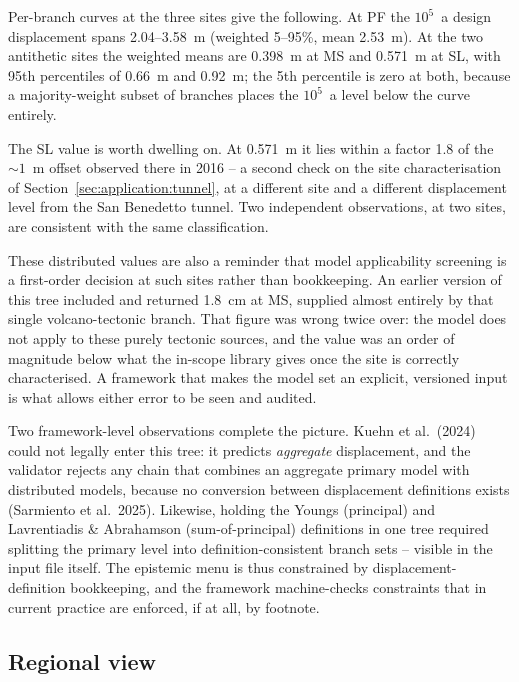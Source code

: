 Per-branch curves at the three sites give the following. At PF the
$10^{5}$~a design displacement spans 2.04--3.58~m (weighted 5--95\%,
mean 2.53~m). At the two antithetic sites the weighted means
are 0.398~m at MS and 0.571~m at SL, with 95th percentiles of 0.66~m
and 0.92~m; the 5th percentile is zero at both, because a
majority-weight subset of branches places the $10^{5}$~a level below
the curve entirely.

The SL value is worth dwelling on. At 0.571~m it lies within a factor
1.8 of the ${\sim}1$~m offset observed there in 2016 -- a second check
on the site characterisation of
Section~\ref{sec:application:tunnel}, at a different site and a
different displacement level from the San Benedetto tunnel. Two
independent observations, at two sites, are consistent with the same
classification.

These distributed values are also a reminder that model applicability
screening is a first-order decision at such sites rather than
bookkeeping. An earlier version of this tree included
\citet{FerrarioLivio2021} and returned 1.8~cm at MS, supplied almost
entirely by that single volcano-tectonic branch. That figure was wrong
twice over: the model does not apply to these purely tectonic sources,
and the value was an order of magnitude below what the in-scope
library gives once the site is correctly characterised. A framework
that makes the model set an explicit, versioned input is what allows
either error to be seen and audited.

Two framework-level observations complete the picture. Kuehn et
al.\ (2024) could not legally enter this tree: it predicts
\emph{aggregate} displacement, and the validator rejects any chain that
combines an aggregate primary model with distributed models, because no
conversion between displacement definitions exists (Sarmiento et
al.\ 2025). Likewise, holding the Youngs (principal) and Lavrentiadis
\& Abrahamson (sum-of-principal) definitions in one tree required
splitting the primary level into definition-consistent branch sets --
visible in the input file itself. The epistemic menu is thus
constrained by displacement-definition bookkeeping, and the framework
machine-checks constraints that in current practice are enforced, if at
all, by footnote.

\subsection{Regional view}
\label{sec:application:map}

